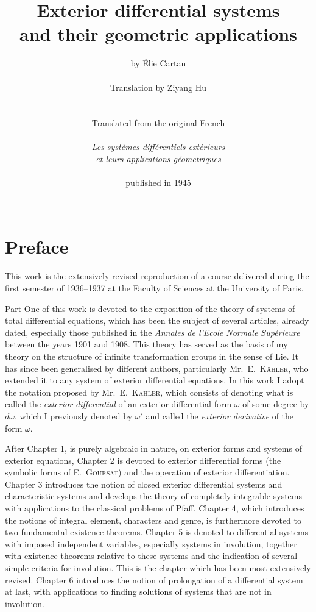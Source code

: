 \documentclass[leqno,11pt]{book}
\title{Exterior differential systems\\
and their geometric applications}
\author{by \'Elie Cartan\\
\\
Translation by Ziyang Hu\\
\\
\\
Translated from the original French\\
\\
\emph{Les syst\`emes diff\'erentiels ext\'erieurs}\\ 
\emph{et leurs applications g\'eometriques}\\
\\
published in 1945\\\\}
\numberwithin{equation}{chapter}
\theoremstyle{shape1}
\theoremstyle{shape0}
\theoremstyle{shape2}
\theoremstyle{definition}
\begin{document}
\renewcommand{\theequation}{\arabic{equation}}
\renewcommand{\thefootnote}{\fnsymbol{footnote}}

\maketitle

\setcounter{frenchsec}{1}
\newcommand{\fsec}{\textbf{\arabic{frenchsec}. }\addtocounter{frenchsec}{1}}

\renewcommand{\qedsymbol}{\textsc{q.e.d.}}
\renewcommand{\thesection}{\roman{section}.}
\renewcommand{\thesubsection}{\Roman{subsection}.}


\chapter*{Preface}

This work is the extensively revised reproduction of a course delivered during the first semester of 1936--1937 at the Faculty of Sciences at the University of Paris.

Part One of this work is devoted to the exposition of the theory of systems of total differential equations, which has been the subject of several articles, already dated, especially those published in the \emph{Annales de l'Ecole Normale Sup\'erieure} between the years 1901 and 1908. This theory has served as the basis of my theory on the structure of infinite transformation groups in the sense of Lie. It has since been generalised by different authors, particularly Mr.~\textsc{E.~K\"ahler}, who extended it to any system of exterior differential equations. In this work I adopt the notation proposed by Mr.~\textsc{E.~K\"ahler}, which consists of denoting what is called the \emph{exterior differential} of an exterior differential form $\omega$ of some degree by $d\omega$, which I previously denoted by $\omega'$ and called the \emph{exterior derivative} of the form $\omega$.

After Chapter 1, is purely algebraic in nature, on exterior forms and systems of exterior equations, Chapter 2 is devoted to exterior differential forms (the symbolic forms of \textsc{E.~Goursat}) and the operation of exterior differentiation. Chapter 3 introduces the notion of closed exterior differential systems and characteristic systems and develops the theory of completely integrable systems with applications to the classical problems of Pfaff. Chapter 4, which introduces the notions of integral element, characters and genre, is furthermore devoted to two fundamental existence theorems. Chapter 5 is denoted to differential systems with imposed independent variables, especially systems in involution, together with existence theorems relative to these systems and the indication of several simple criteria for involution. This is the chapter which has been most extensively revised. Chapter 6 introduces the notion of prolongation of a differential system at last, with applications to finding solutions of systems that are not in involution.
\end{document}
